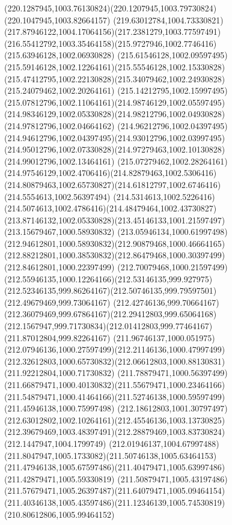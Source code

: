 {{\curveto(220.1287945,1003.76130824)(220.1207945,1003.79730824)(220.1047945,1003.82664157)
\curveto(219.63012784,1004.73330821)(217.87946122,1004.17064156)(217.2381279,1003.77597491)
\curveto(216.55412792,1003.35464158)(215.9727946,1002.7746416)(215.63946128,1002.06930828)
\curveto(215.61546128,1002.09597495)(215.59146128,1002.12264161)(215.55546128,1002.15330828)
\curveto(215.47412795,1002.22130828)(215.34079462,1002.24930828)(215.24079462,1002.20264161)
\curveto(215.14212795,1002.15997495)(215.07812796,1002.11064161)(214.98746129,1002.05597495)
\curveto(214.98346129,1002.05330828)(214.98212796,1002.04930828)(214.97812796,1002.04664162)
\curveto(214.96212796,1002.04397495)(214.94612796,1002.04397495)(214.93012796,1002.03997495)
\curveto(214.95012796,1002.07330828)(214.97279463,1002.10130828)(214.99012796,1002.13464161)
\curveto(215.07279462,1002.28264161)(214.97546129,1002.4706416)(214.82879463,1002.5306416)
\curveto(214.80879463,1002.65730827)(214.61812797,1002.6746416)(214.5554613,1002.56397494)
\curveto(214.5314613,1002.5226416)(214.5074613,1002.4786416)(214.48479464,1002.43730827)
\curveto(213.87146132,1002.05330828)(213.45146133,1001.21597497)(213.15679467,1000.58930832)
\curveto(213.05946134,1000.61997498)(212.94612801,1000.58930832)(212.90879468,1000.46664165)
\curveto(212.88212801,1000.38530832)(212.86479468,1000.30397499)(212.84612801,1000.22397499)
\curveto(212.70079468,1000.21597499)(212.55946135,1000.12264166)(212.53146135,999.927975)
\curveto(212.52346135,999.86264167)(212.50746135,999.79597501)(212.49679469,999.73064167)
\curveto(212.42746136,999.70664167)(212.36079469,999.67864167)(212.29412803,999.65064168)
\curveto(212.1567947,999.71730834)(212.01412803,999.77464167)(211.87012804,999.82264167)
\curveto(211.96746137,1000.051975)(212.07946136,1000.27597499)(212.21146136,1000.47997499)
\curveto(212.32612803,1000.65730832)(212.06612803,1000.88130831)(211.92212804,1000.71730832)
\curveto(211.78879471,1000.56397499)(211.66879471,1000.40130832)(211.55679471,1000.23464166)
\curveto(211.54879471,1000.41464166)(211.52746138,1000.59597499)(211.45946138,1000.75997498)
\curveto(212.18612803,1001.30797497)(212.63012802,1002.10264161)(212.45546136,1003.13730825)
\curveto(212.39679469,1003.48397491)(212.28879469,1003.83730824)(212.1447947,1004.1799749)
\curveto(212.01946137,1004.67997488)(211.8047947,1005.1733082)(211.50746138,1005.63464153)
\curveto(211.47946138,1005.67597486)(211.40479471,1005.63997486)(211.42879471,1005.59330819)
\curveto(211.50879471,1005.43197486)(211.57679471,1005.26397487)(211.64079471,1005.09464154)
\curveto(211.40346138,1005.43597486)(211.12346139,1005.74530819)(210.80612806,1005.99464152)
}}
